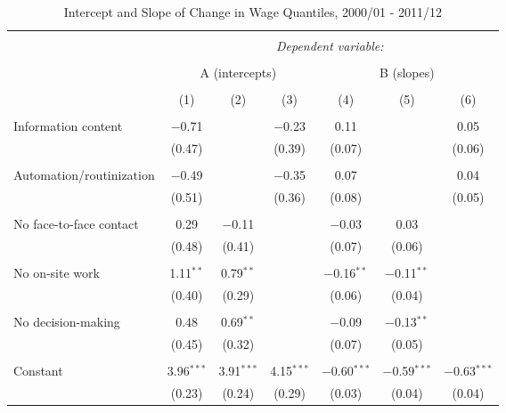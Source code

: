 

\begin{sidewaystable}[!htbp] \centering 
  \caption{Intercept and Slope of Change in Wage Quantiles, 2000/01 - 2011/12} 
  \label{tab:quantreg2} 
\begin{tabular}{@{\extracolsep{0pt}}lcccccc} 
\\[-1.8ex]\hline 
\hline \\[-1.8ex] 
 & \multicolumn{6}{c}{\textit{Dependent variable:}} \\ 
\cline{2-7} 
\\[-1.8ex] & \multicolumn{3}{c}{A (intercepts)} & \multicolumn{3}{c}{B (slopes)} \\ 
\\[-1.8ex] & (1) & (2) & (3) & (4) & (5) & (6)\\ 
\hline \\[-1.8ex] 
 Information content & $-$0.71 &  & $-$0.23 & 0.11 &  & 0.05 \\ 
  & (0.47) &  & (0.39) & (0.07) &  & (0.06) \\ 
  & & & & & & \\ 
 Automation/routinization & $-$0.49 &  & $-$0.35 & 0.07 &  & 0.04 \\ 
  & (0.51) &  & (0.36) & (0.08) &  & (0.05) \\ 
  & & & & & & \\ 
 No face-to-face contact & 0.29 & $-$0.11 &  & $-$0.03 & 0.03 &  \\ 
  & (0.48) & (0.41) &  & (0.07) & (0.06) &  \\ 
  & & & & & & \\ 
 No on-site work & 1.11$^{**}$ & 0.79$^{**}$ &  & $-$0.16$^{**}$ & $-$0.11$^{**}$ &  \\ 
  & (0.40) & (0.29) &  & (0.06) & (0.04) &  \\ 
  & & & & & & \\ 
 No decision-making & 0.48 & 0.69$^{**}$ &  & $-$0.09 & $-$0.13$^{**}$ &  \\ 
  & (0.45) & (0.32) &  & (0.07) & (0.05) &  \\ 
  & & & & & & \\ 
 Constant & 3.96$^{***}$ & 3.91$^{***}$ & 4.15$^{***}$ & $-$0.60$^{***}$ & $-$0.59$^{***}$ & $-$0.63$^{***}$ \\ 
  & (0.23) & (0.24) & (0.29) & (0.03) & (0.04) & (0.04) \\ 

\end{tabular}
\end{sidewaystable}
